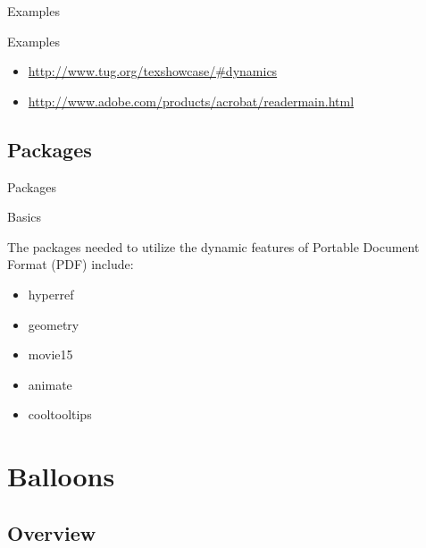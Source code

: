 \documentclass[article]{beamer}
\begin{document}
\begin{frame}[fragile]{Examples}

\begin{block}{Examples}

\begin{itemize}

\item{\url{http://www.tug.org/texshowcase/#dynamics}}
\item{\url{http://www.adobe.com/products/acrobat/readermain.html}}

\end{itemize}

\end{block}

\end{frame}

\subsection{Packages}

\begin{frame}[fragile]{Packages}

\begin{block}{Basics}

The packages needed to utilize the dynamic features of Portable Document Format (PDF) include:

\begin{itemize}

\item hyperref
\item geometry
\item movie15
\item animate
\item cooltooltips

\end{itemize}

\end{block}

\end{frame}

\section{Balloons}
\subsection{Overview}
\end{document}
